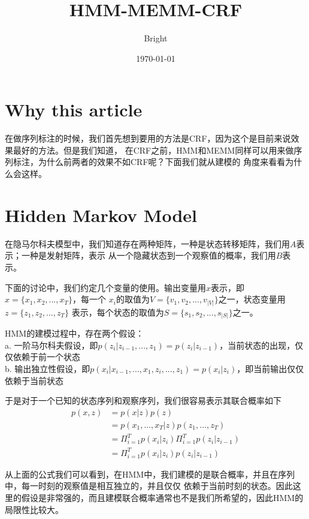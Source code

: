 \documentclass[UTF8]{ctexart}
\title{HMM-MEMM-CRF}
\author{Bright}
\date{\today}
\begin{document}
\maketitle
\tableofcontents

\pagestyle{fancy}
\cfoot{\thepage}

\newcommand{\figref}[1]{\figurename~\ref{#1}}
\section{Why this article}
在做序列标注的时候，我们首先想到要用的方法是CRF，因为这个是目前来说效果最好的方法。但是我们知道，
在CRF之前，HMM和MEMM同样可以用来做序列标注，为什么前两者的效果不如CRF呢？下面我们就从建模的
角度来看看为什么会这样。

\section{Hidden Markov Model}
在隐马尔科夫模型中，我们知道存在两种矩阵，一种是状态转移矩阵，我们用$A$表示；一种是发射矩阵，表示
从一个隐藏状态到一个观察值的概率，我们用$B$表示。
\par
下面的讨论中，我们约定几个变量的使用。输出变量用$x$表示，即$x = \{x_1, x_2, ..., x_T\}$，每一个
$x_i$的取值为$V=\{ v_1, v_2, ..., v_{|V|} \}$之一，状态变量用$z = \{z_1, z_2, ..., z_T\}$
表示，每个状态的取值为$S=\{s_1, s_2, ..., s_{|S|}\}$之一。
\par
HMM的建模过程中，存在两个假设：\\
a. 一阶马尔科夫假设，即$p(z_i|z_{i-1}, ..., z_1) = p(z_i|z_{i-1})$，当前状态的出现，仅仅依赖于前一个状态\\
b. 输出独立性假设，即$p(x_i|x_{i-1}, ..., x_1, z_i, ..., z_1) = p(x_i|z_i)$，即当前输出仅仅依赖于当前状态\\
\par
于是对于一个已知的状态序列和观察序列，我们很容易表示其联合概率如下
\begin{align}
p(x,z) &= p(x|z)p(z)
\\
&= p(x_1,..., x_T|z)p(z_1, ..., z_T)
\\
&= \Pi_{i=1}^{T}p(x_i|z_i) \Pi_{i=1}^{T} p(z_i|z_{i-1})
\\
&= \Pi_{i=1}^{T}p(x_i|z_i)p(z_i|z_{i-1})
\end{align}
\par
从上面的公式我们可以看到，在HMM中，我们建模的是联合概率，并且在序列中，每一时刻的观察值是相互独立的，并且仅仅
依赖于当前时刻的状态。因此这里的假设是非常强的，而且建模联合概率通常也不是我们所希望的，因此HMM的局限性比较大。
\end{document}
